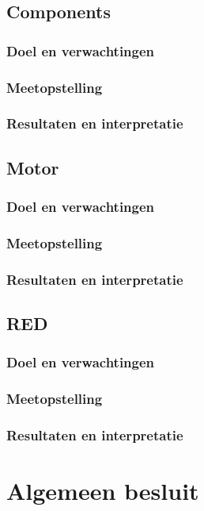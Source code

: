\documentclass[twoside,kul]{kulakreport} %
\begin{document}
	\section{Components}
	\subsection{Doel en verwachtingen}
	\subsection{Meetopstelling}
	\subsection{Resultaten en interpretatie}

	\section{Motor}
	\subsection{Doel en verwachtingen}
	\subsection{Meetopstelling}
	\subsection{Resultaten en interpretatie}

	\section{RED}
	\subsection{Doel en verwachtingen}
	\subsection{Meetopstelling}
	\subsection{Resultaten en interpretatie}


	\chapter*{Algemeen besluit}
	
\end{document}
